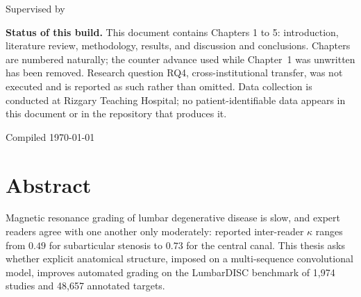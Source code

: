 \begin{titlepage}
\centering
\vspace*{2cm}

{\Large\bfseries \thesistitle \par}

\vspace{2.5cm}
{\large \thesiscandidate \par}

\vspace{1cm}
{\normalsize Supervised by \thesissupervisor \par}

\vspace{2.5cm}
{\normalsize \thesisinstitution \par}
\vspace{0.5cm}
{\normalsize \thesisdegree \par}

\vfill

\begin{minipage}{0.85\textwidth}
\footnotesize\raggedright
\textbf{Status of this build.} This document contains Chapters 1 to 5:
introduction, literature review, methodology, results, and discussion and
conclusions. Chapters are numbered naturally; the counter advance used while
Chapter~1 was unwritten has been removed. Research question RQ4,
cross-institutional transfer, was not executed and is reported as such rather
than omitted. Data collection is conducted at Rizgary Teaching Hospital; no
patient-identifiable data appears in this document or in the repository that
produces it.
\end{minipage}

\vspace{1cm}
{\footnotesize Compiled \today \par}
\end{titlepage}

\cleardoublepage
\chapter*{Abstract}

Magnetic resonance grading of lumbar degenerative disease is slow, and expert
readers agree with one another only moderately: reported inter-reader $\kappa$
ranges from $0.49$ for subarticular stenosis to $0.73$ for the central canal.
This thesis asks whether explicit anatomical structure, imposed on a
multi-sequence convolutional model, improves automated grading on the LumbarDISC
benchmark of 1{,}974 studies and 48{,}657 annotated targets.

